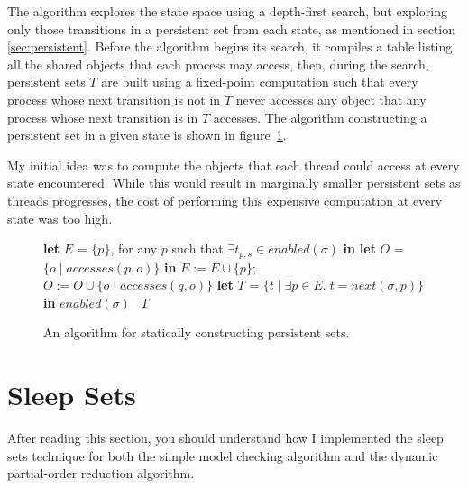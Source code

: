 \documentclass[12pt,a4paper,twoside,openright]{report}
\newcommand{\Let}[2]{\State \textbf{let} #1 = #2 \textbf{in}}
\begin{document}
The algorithm explores the state space using a
depth-first search, but exploring only those
transitions in a persistent set from each
state, as mentioned in section \ref{sec:persistent}.
Before the algorithm begins its search, it compiles a table
listing all the shared objects that each process may
access, then, during the search, persistent sets $T$ are built
using a fixed-point computation such that
every process whose next transition is
not in $T$ never accesses any
object that any process whose next
transition is in $T$ accesses.
The algorithm constructing a persistent set in a given state
is shown in figure~\ref{fig:spor-code}.

My initial idea was to compute the objects that
each thread could access at every state encountered.
While this would result in marginally smaller
persistent sets as threads progresses, the cost
of performing this expensive computation at
every state was too high.

\begin{figure}
	\begin{algorithmic}[1]
		\Let{$E$}{$\{p\}$,
			for any $p$ such that
			$\exists t_{p,s} \in \textit{enabled}(\sigma)$}
		\Let{$O$}{$\{o \mid \textit{accesses}(p, o)\}$}
				\State $E := E \cup \{p\}$;
				\State $O := O \cup \{o \mid
					\textit{accesses}(q, o)\}$
				\EndIf
			\EndFor
		\EndWhile
		\Let{$T$}{$\{t \mid \exists p \in E.\;
					t = \textit{next}(\sigma,p)\}$}
			\Return $\textit{enabled}(\sigma)$
		\Else \ \Return $T$
		\EndIf
		\EndProcedure
	\end{algorithmic}
	\caption{An algorithm for statically constructing
		persistent sets.}
	\label{fig:spor-code}
\end{figure}

\section{Sleep Sets}
After reading this section, you
should understand how I implemented
the sleep sets technique for both the
simple model checking algorithm and
the dynamic partial-order reduction
algorithm.
\end{document}
